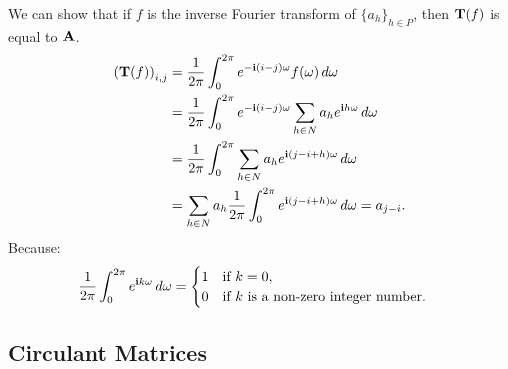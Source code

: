 \noindent
We can show that if $f$ is the inverse Fourier transform of $\{a_h\}_{h \in P}$, then $\mathbf{T}(f)$ is equal to $\mathbf{A}$.
\begingroup
\allowdisplaybreaks
  \begin{align}
      \leftmat \Tmat(f) \rightmat_{i, j} &= \frac{1}{2\pi} \int_0^{2\pi} e^{-\ci (i-j)\omega} f(\omega) \,d\omega  \\
      &= \frac{1}{2\pi} \int_0^{2\pi} e^{-\ci (i-j) \omega} \sum_{h \in N} a_h e^{\ci h \omega} \,d\omega  \\
      &= \frac{1}{2\pi} \int_0^{2\pi} \sum_{h \in N} a_h e^{\ci (j - i + h) \omega} \,d\omega  \\
      &= \sum_{h \in N} a_h \frac{1}{2\pi} \int_0^{2\pi} e^{\ci (j - i + h) \omega} \,d\omega 
      = a_{j-i} .
  \end{align}
\endgroup
Because:
\begin{equation}
  \frac{1}{2\pi} \int_0^{2\pi} e^{\mathbf{i} k \omega} \,d\omega = 
  \begin{cases}
    1 \quad \text{if}\ k = 0, \\
    0 \quad \text{if}\ k\ \text{is a non-zero integer number.}
  \end{cases}
\end{equation}




\subsection{Circulant Matrices}
\label{subsection:ch2-circulant_matrices}


